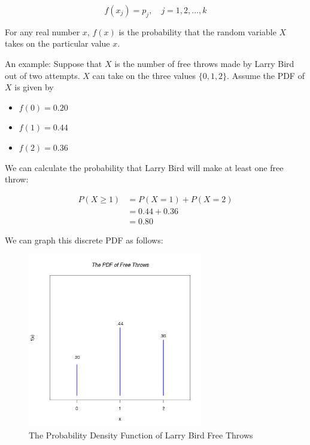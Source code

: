 \documentclass[11pt]{article}
\begin{document}
\begin{equation*}
f(x_{j}) = p_{j}, \quad \mbox{$j = 1, 2, \ldots, k$}
\end{equation*}

\vspace{2mm}

For any real number $x$, $f(x)$ is the probability that the random variable $X$ takes on the particular value $x$.

\vspace{2mm}
\newpage
An example: Suppose that $X$ is the number of free throws made by Larry Bird out of two attempts. $X$ can take on 
the three values $\{0, 1, 2\}$. Assume the PDF of $X$ is given by

\begin{itemize}
 \item[] $f(0) = 0.20$
 \item[] $f(1) = 0.44$
 \item[] $f(2) = 0.36$
\end{itemize}

\vspace{2mm}

We can calculate the probability that Larry Bird will make at least one free throw: 

\begin{align*}
P(X \geq 1) &= P(X = 1) + P(X = 2) \\
            &= 0.44 + 0.36 \\
            &= 0.80 
\end{align*}

\vspace{2mm}

We can graph this discrete PDF as follows:

\vspace{2mm}

\begin{figure}[h]
\centering
\includegraphics[width=3in]{Larry.jpeg}
\caption{The Probability Density Function of Larry Bird Free Throws}
\end{figure}
\end{document}
